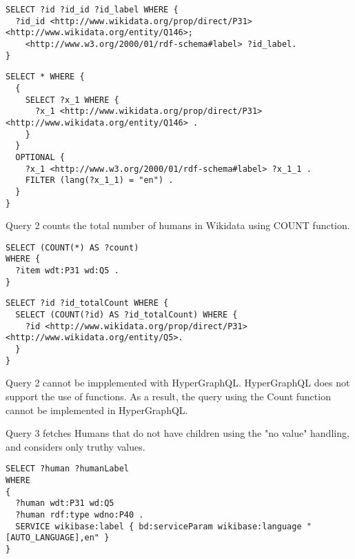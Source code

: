 \begin{minipage}{\linewidth}
\begin{lstlisting}[label=listing:listing35, caption={Query 1 - GraphQL-LD}]
SELECT ?id ?id_id ?id_label WHERE {
  ?id_id <http://www.wikidata.org/prop/direct/P31> <http://www.wikidata.org/entity/Q146>;
    <http://www.w3.org/2000/01/rdf-schema#label> ?id_label.
}
\end{lstlisting}
\end{minipage}


\begin{minipage}{\linewidth}
\begin{lstlisting}[label=listing:listing36, caption={Query 1 - HypergraphQL}]
SELECT * WHERE {
  {
    SELECT ?x_1 WHERE {
      ?x_1 <http://www.wikidata.org/prop/direct/P31> <http://www.wikidata.org/entity/Q146> .
    }
  }
  OPTIONAL {
    ?x_1 <http://www.w3.org/2000/01/rdf-schema#label> ?x_1_1 .
    FILTER (lang(?x_1_1) = "en") .
  }
}
\end{lstlisting}
\end{minipage}


Query 2 counts the total number of humans in Wikidata using COUNT function.

\begin{minipage}{\linewidth}
\begin{lstlisting}[label=listing:listing37, caption={Query 2}]
SELECT (COUNT(*) AS ?count)
WHERE {
  ?item wdt:P31 wd:Q5 .
}
\end{lstlisting}
\end{minipage}


\begin{minipage}{\linewidth}
\begin{lstlisting}[label=listing:listing38, caption={Query 2 - GraphQL-LD}]
SELECT ?id ?id_totalCount WHERE {
  SELECT (COUNT(?id) AS ?id_totalCount) WHERE {
    ?id <http://www.wikidata.org/prop/direct/P31> <http://www.wikidata.org/entity/Q5>.
  }
}
\end{lstlisting}
\end{minipage}

Query 2 cannot be impplemented with HyperGraphQL. HyperGraphQL does not support the use of functions. As a result, the query using the Count function cannot be implemented in HyperGraphQL.


Query 3 fetches Humans that do not have children using the "no value" handling, and considers only truthy values. 

\begin{minipage}{\linewidth}
\begin{lstlisting}[label=listing:listing39, caption={Query 3}]
SELECT ?human ?humanLabel
WHERE
{
  ?human wdt:P31 wd:Q5 
  ?human rdf:type wdno:P40 .  
  SERVICE wikibase:label { bd:serviceParam wikibase:language "[AUTO_LANGUAGE],en" }
}
\end{lstlisting}
\end{minipage}


